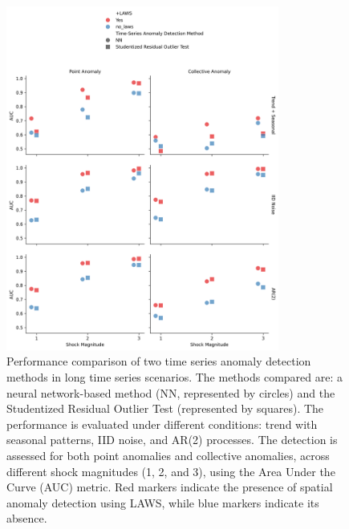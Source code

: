 \documentclass[11pt]{article}
\begin{document}
\begin{figure}[h]
    \centering
    \includegraphics[width=0.8\textwidth]{../figure/simulation_long_time_series.png}
    \caption{Performance comparison of two time series anomaly detection methods in long time series scenarios. The methods compared are: a neural network-based method (NN, represented by circles) and the Studentized Residual Outlier Test (represented by squares). The performance is evaluated under different conditions: trend with seasonal patterns, IID noise, and AR(2) processes. The detection is assessed for both point anomalies and collective anomalies, across different shock magnitudes (1, 2, and 3), using the Area Under the Curve (AUC) metric. Red markers indicate the presence of spatial anomaly detection using LAWS, while blue markers indicate its absence.}
    \label{fig: simulation long time series}
\end{figure}
\end{document}
